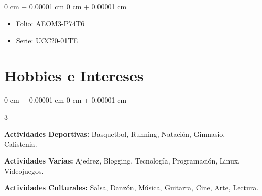\documentclass[10pt, letterpaper]{article}
\newenvironment{highlights}{
    \begin{itemize}[
        topsep=0.10 cm,
        parsep=0.10 cm,
        partopsep=0pt,
        itemsep=0pt,
        leftmargin=0 cm + 10pt
    ]
}{
    \end{itemize}
} %
\newenvironment{onecolentry}{
    \begin{adjustwidth}{
        0 cm + 0.00001 cm
    }{
        0 cm + 0.00001 cm
    }
}{
    \end{adjustwidth}
} %
\newenvironment{threecolentry}[3][]{
    \onecolentry
    \def\thirdColumn{#3}
    \setcolumnwidth{, \fill, 4.5 cm}
    \begin{paracol}{3}
    {\raggedright #2} \switchcolumn
}{
    \switchcolumn \raggedleft \thirdColumn
    \end{paracol}
    \endonecolentry
} %
\begin{document}
        \vspace{0.10 cm}
        \begin{onecolentry}
            \begin{highlights}
                \item Folio: AEOM3-P74T6
                \item Serie: UCC20-01TE
            \end{highlights}
        \end{onecolentry}

 \section{Hobbies e Intereses}

\begin{threecolentry}{
    \textbf{Actividades Deportivas:} Basquetbol, Running, Natación, Gimnasio, Calistenia.
}{
    \textbf{Actividades Culturales:} Salsa, Danzón, Música, Guitarra, Cine, Arte, Lectura. 
}{
    \textbf{Actividades Varias:} Ajedrez, Blogging, Tecnología, Programación, Linux, Videojuegos.
}
\end{threecolentry}
\end{document}
